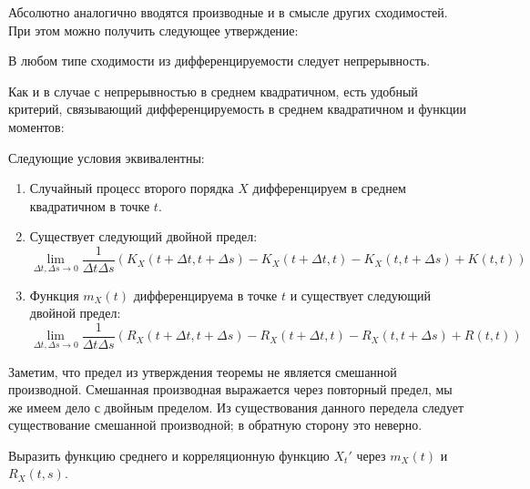 Абсолютно аналогично вводятся производные и в смысле других сходимостей.
При этом можно получить следующее утверждение:

\begin{statement}
    \label{statement:calculus:continuity_from_differentiability}
    В любом типе сходимости из дифференцируемости следует непрерывность.
\end{statement}

Как и в случае с непрерывностью в среднем квадратичном,
есть удобный критерий, связывающий дифференцируемость в среднем квадратичном и функции моментов:

\begin{theorem}
    \label{theorem:calculus:mean_squares_differentiability_test}
    Следующие условия эквивалентны:
    \begin{enumerate}
        \item
            Случайный процесс второго порядка $ X $ дифференцируем в среднем квадратичном в точке $ t $.
        \item
            Существует следующий двойной предел:
            \[
                \lim_{\Delta t, \Delta s \to 0} \frac{1}{\Delta t \Delta s}
                \left( K_X(t + \Delta t, t + \Delta s) - K_X(t + \Delta t, t) - K_X(t, t + \Delta s) + K(t, t) \right)
            \]
        \item
            Функция $ m_X(t) $ дифференцируема в точке $ t $ и существует следующий двойной предел:
            \[
                \lim_{\Delta t, \Delta s \to 0} \frac{1}{\Delta t \Delta s}
                \left( R_X(t + \Delta t, t + \Delta s) - R_X(t + \Delta t, t) - R_X(t, t + \Delta s) + R(t, t) \right)
            \]
    \end{enumerate}
\end{theorem}

Заметим, что предел из утверждения теоремы не является смешанной производной.
Смешанная производная выражается через повторный предел,
мы же имеем дело с двойным пределом.
Из существования данного передела следует существование смешанной производной;
в обратную сторону это неверно.

\begin{exercise}
    \label{exercise:moments_functions_of_derivative}
    Выразить функцию среднего и корреляционную функцию $ X_t' $ через $ m_X(t) $ и $ R_X(t, s) $.
\end{exercise}

